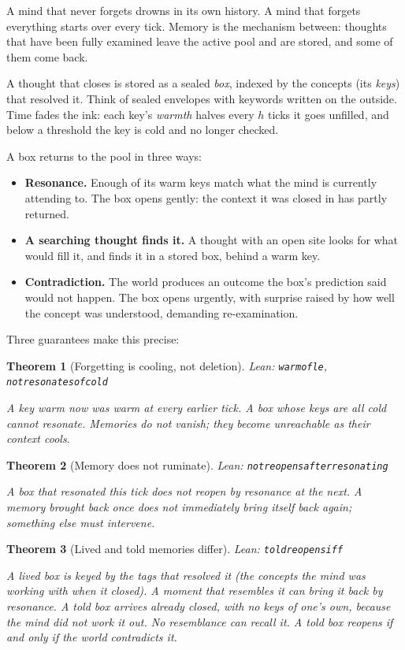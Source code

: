 \documentclass[11pt]{article}
\newcommand{\leanus}{\textunderscore\allowbreak}
\newcommand{\lean}[1]{{\let\_\leanus\texttt{#1}}}
\newtheorem{theorem}{Theorem}[section]
\theoremstyle{remark}
\begin{document}
A mind that never forgets drowns in its own history. A mind that forgets everything starts
over every tick. Memory is the mechanism between: thoughts that have been fully examined
leave the active pool and are stored, and some of them come back.

A thought that closes is stored as a sealed \emph{box}, indexed by the concepts (its
\emph{keys}) that resolved it. Think of sealed envelopes with keywords written on the
outside. Time fades the ink: each key's \emph{warmth} halves every $h$ ticks it goes
unfilled, and below a threshold the key is cold and no longer checked.

A box returns to the pool in three ways:
\begin{itemize}[nosep]
    \item \textbf{Resonance.} Enough of its warm keys match what the mind is currently
    attending to. The box opens gently: the context it was closed in has partly returned.
    \item \textbf{A searching thought finds it.} A thought with an open site looks for
    what would fill it, and finds it in a stored box, behind a warm key.
    \item \textbf{Contradiction.} The world produces an outcome the box's prediction said
    would not happen. The box opens urgently, with surprise raised by how well the concept
    was understood, demanding re-examination.
\end{itemize}

Three guarantees make this precise:

\begin{theorem}[Forgetting is cooling, not deletion]
{\small\sloppy Lean: \lean{warm\_of\_le}, \lean{not\_resonates\_of\_cold}\par}
A key warm now was warm at every earlier tick. A box whose keys are all cold cannot
resonate. Memories do not vanish; they become unreachable as their context cools.
\end{theorem}

\begin{theorem}[Memory does not ruminate]
{\small\sloppy Lean: \lean{not\_reopens\_after\_resonating}\par}
A box that resonated this tick does not reopen by resonance at the next. A memory brought
back once does not immediately bring itself back again; something else must intervene.
\end{theorem}

\begin{theorem}[Lived and told memories differ]
{\small\sloppy Lean: \lean{told\_reopens\_iff}\par}
A lived box is keyed by the tags that resolved it (the concepts the mind was working with
when it closed). A moment that resembles it can bring it back by resonance. A told box
arrives already closed, with no keys of one's own, because the mind did not work it out.
No resemblance can recall it. A told box reopens if and only if the world contradicts it.
\end{theorem}
\end{document}

